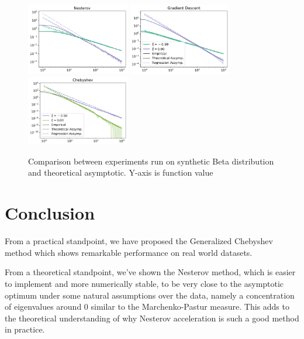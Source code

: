 \documentclass{article}
\begin{document}
\begin{figure}[H]
    \centering
    \includegraphics[width= 0.4\textwidth]{new_imgs/nesterov.png}
    \includegraphics[width= 0.4\textwidth]{new_imgs/GD.png}\\
        \includegraphics[width= 0.4\textwidth]{new_imgs/chebyshev.png}

    \caption{Comparison between experiments run on synthetic Beta distribution and theoretical asymptotic. Y-axis is function value }
    \label{fig: last figure}
\end{figure}




\section{Conclusion}
From a practical standpoint, we have proposed the Generalized Chebyshev method which shows remarkable performance on real world datasets. 

From a theoretical standpoint, we've shown the Nesterov method, which is easier to implement and more numerically stable, to be very close to the asymptotic optimum   under some natural assumptions over the data, namely a concentration of eigenvalues around $0$ similar to the Marchenko-Pastur measure. This adds to the theoretical understanding of why Nesterov acceleration is such a good method in practice. 
\end{document}
